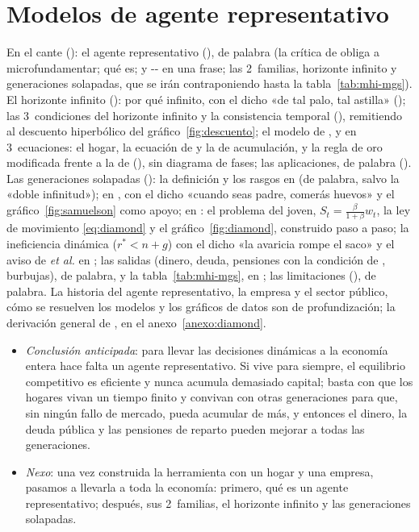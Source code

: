 \documentclass[11pt]{article}
\begin{document}
\section{Modelos de agente representativo}\label{sec:macro-mhi}

\begin{notaopositor}
En el cante (): el agente representativo (), de palabra (la crítica de  obliga a microfundamentar; qué es;  y -- en una frase; las 2~familias, horizonte infinito y generaciones solapadas, que se irán contraponiendo hasta la tabla~\ref{tab:mhi-mgs}). El horizonte infinito (): por qué infinito, con el dicho «de tal palo, tal astilla» (); las 3~condiciones del horizonte infinito y la consistencia temporal (), remitiendo al descuento hiperbólico del gráfico~\ref{fig:descuento}; el modelo de ,  y  en 3~ecuaciones: el hogar, la ecuación de  y la de acumulación, y la regla de oro modificada frente a la de  (), sin diagrama de fases; las aplicaciones, de palabra (). Las generaciones solapadas (): la definición y los rasgos en  (de palabra, salvo la «doble infinitud»);  en , con el dicho «cuando seas padre, comerás huevos» y el gráfico~\ref{fig:samuelson} como apoyo;  en : el problema del joven, $S_t=\frac{\beta}{1+\beta}w_t$, la ley de movimiento \eqref{eq:diamond} y el gráfico~\ref{fig:diamond}, construido paso a paso; la ineficiencia dinámica ($r^*<n+g$) con el dicho «la avaricia rompe el saco» y el aviso de  \emph{et al.} en ; las salidas (dinero, deuda, pensiones con la condición de , burbujas), de palabra, y la tabla~\ref{tab:mhi-mgs}, en ; las limitaciones (), de palabra. La historia del agente representativo, la empresa y el sector público, cómo se resuelven los modelos y los gráficos de datos son de profundización; la derivación general de , en el anexo~\ref{anexo:diamond}.
\end{notaopositor}

\begin{itemize}
\item \emph{Conclusión anticipada}: para llevar las decisiones dinámicas a la economía entera hace falta un agente representativo. Si vive para siempre, el equilibrio competitivo es eficiente y nunca acumula demasiado capital; basta con que los hogares vivan un tiempo finito y convivan con otras generaciones para que, sin ningún fallo de mercado, pueda acumular de más, y entonces el dinero, la deuda pública y las pensiones de reparto pueden mejorar a todas las generaciones.
\item \emph{Nexo}: una vez construida la herramienta con un hogar y una empresa, pasamos a llevarla a toda la economía: primero, qué es un agente representativo; después, sus 2~familias, el horizonte infinito y las generaciones solapadas.
\end{itemize}
\end{document}
